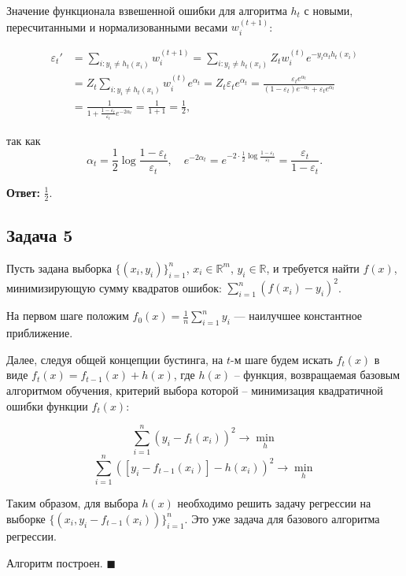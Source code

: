 \documentclass[a4paper, 12pt, onepage]{article}
\begin{document}
Значение функционала взвешенной ошибки для алгоритма $h_t$ с новыми, пересчитанными и нормализованными весами $w^{(t+1)}_i$:

\begin{align*}
\varepsilon_t'
  &= \sum_{i: y_i \ne h_t(x_i)} w^{(t+1)}_i = \sum_{i: y_i \ne h_t(x_i)} Z_t w^{(t)}_i e^{-y_i \alpha_t h_t(x_i)}\\
  &= Z_t \sum_{i: y_i \ne h_t(x_i)} w^{(t)}_i e^{\alpha_t} = Z_t \varepsilon_t e^{\alpha_t} =
     \frac{\varepsilon_t e^{\alpha_t}}{(1 - \varepsilon_t) e^{-\alpha_t} + \varepsilon_t e^{\alpha_t}} \\
  &= \frac{1}{1 + \frac{1 - \varepsilon_t}{\varepsilon_t} e^{-2 \alpha_t}} = \frac{1}{1 + 1} = \frac{1}{2},
\end{align*}

так как
$$ \alpha_t = \frac 12 \log \frac{1 - \varepsilon_t}{\varepsilon_t}, \quad
e^{-2 \alpha_t} = e^{-2 \cdot \frac 12 \log\frac{1-\varepsilon_t}{\varepsilon_t}} = \frac{\varepsilon_t}{1 - \varepsilon_t}. $$

\textbf{Ответ:} $\displaystyle \frac{1}{2}$.

\newpage
\subsection*{Задача 5}

Пусть задана выборка $\{ (x_i, y_i) \}_{i=1}^n$, $x_i \in \mathbb{R}^m$, $y_i \in \mathbb{R}$,
и требуется найти $f(x)$, минимизирующую сумму квадратов ошибок:
$ \sum_{i=1}^n (f(x_i) - y_i)^2$.

На первом шаге положим $f_0(x) = \frac1n \sum_{i=1}^n y_i$ --- наилучшее константное приближение.

Далее, следуя общей концепции бустинга, на $t$-м шаге будем искать $f_t(x)$
в виде $f_t(x) = f_{t-1}(x) + h(x)$, где $h(x)$ -- функция, возвращаемая базовым
алгоритмом обучения, критерий выбора которой -- минимизация квадратичной ошибки функции $f_t(x)$:

$$ \sum_{i=1}^n (y_i - f_t(x_i))^2 \to \min_h $$
$$ \sum_{i=1}^n ([y_i - f_{t-1}(x_i)] - h(x_i))^2 \to \min_h $$

Таким образом, для выбора $h(x)$ необходимо решить задачу регрессии на
выборке $ \{ (x_i, y_i - f_{t-1}(x_i)) \}_{i=1}^n$. Это уже задача для базового алгоритма регрессии.

Алгоритм построен. \hfill $\blacksquare$
\end{document}

